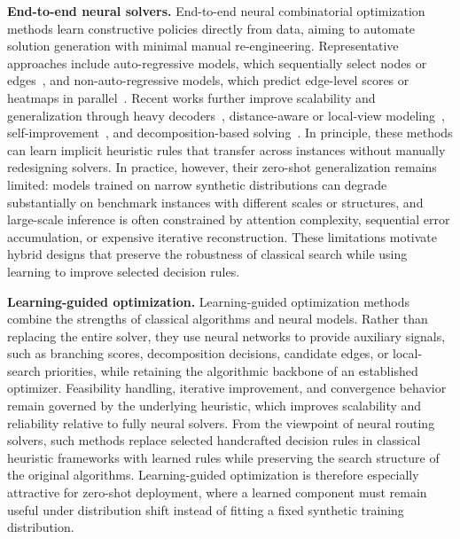 \smallskip\noindent\textbf{End-to-end neural solvers.}
End-to-end neural combinatorial optimization methods learn constructive policies directly from data, aiming to automate solution generation with minimal manual re-engineering. Representative approaches include auto-regressive models, which sequentially select nodes or edges~\cite{point,attentionmodel,pomo,mdam,symnco,bq,lehd,l2c}, and non-auto-regressive models, which predict edge-level scores or heatmaps in parallel~\cite{gcn,dimes,difusco,t2t,fastt2t}. Recent works further improve scalability and generalization through heavy decoders~\cite{bq,lehd,reld}, distance-aware or local-view modeling~\cite{elg,invit,icam,dgl}, self-improvement~\cite{sil}, and decomposition-based solving~\cite{htsp,glop,udc}. In principle, these methods can learn implicit heuristic rules that transfer across instances without manually redesigning solvers. In practice, however, their zero-shot generalization remains limited: models trained on narrow synthetic distributions can degrade substantially on benchmark instances with different scales or structures, and large-scale inference is often constrained by attention complexity, sequential error accumulation, or expensive iterative reconstruction. These limitations motivate hybrid designs that preserve the robustness of classical search while using learning to improve selected decision rules.

\smallskip\noindent\textbf{Learning-guided optimization.}
Learning-guided optimization methods~\cite{learn2branch,learn2delegate,neurolkh,rgls} combine the strengths of classical algorithms and neural models. Rather than replacing the entire solver, they use neural networks to provide auxiliary signals, such as branching scores, decomposition decisions, candidate edges, or local-search priorities, while retaining the algorithmic backbone of an established optimizer. Feasibility handling, iterative improvement, and convergence behavior remain governed by the underlying heuristic, which improves scalability and reliability relative to fully neural solvers. From the viewpoint of neural routing solvers, such methods replace selected handcrafted decision rules in classical heuristic frameworks with learned rules while preserving the search structure of the original algorithms. Learning-guided optimization is therefore especially attractive for zero-shot deployment, where a learned component must remain useful under distribution shift instead of fitting a fixed synthetic training distribution.


